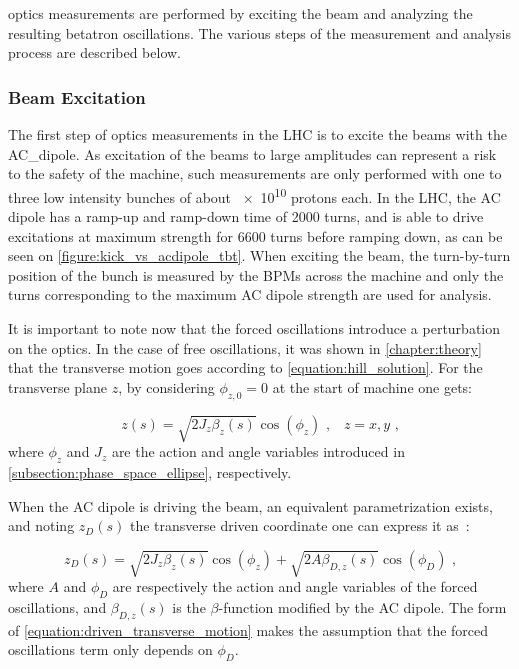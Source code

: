 \Gls{optics} measurements are performed by exciting the beam and analyzing the resulting betatron oscillations.
The various steps of the measurement and analysis process are described below.

\subsubsection*{Beam Excitation}

The first step of optics measurements in the LHC is to excite the beams with the \gls{AC_dipole}.
As excitation of the beams to large amplitudes can represent a risk to the safety of the machine, such measurements are only performed with one to three low intensity bunches of about \num{e10} protons each.
In the LHC, the AC dipole has a ramp-up and ramp-down time of \num{2000} turns, and is able to drive excitations at maximum strength for \num{6600} turns before ramping down, as can be seen on \cref{figure:kick_vs_acdipole_tbt}.
When exciting the beam, the turn-by-turn position of the bunch is measured by the \glspl{BPM} across the machine and only the turns corresponding to the maximum AC dipole strength are used for analysis.

It is important to note now that the forced oscillations introduce a perturbation on the optics.
In the case of free oscillations, it was shown in \cref{chapter:theory} that the transverse motion goes according to \cref{equation:hill_solution}.
For the transverse plane \(z\), by considering \(\phi_{z,0} = 0\) at the start of machine one gets:

\begin{equation}
  z(s) = \sqrt{2 J_z \beta_z(s)} \cos \left( \phi_z \right)  \text{ ,} \quad z = x, y \text{ ,}
  \label{equation:free_transverse_motion}
\end{equation}
where \(\phi_z\) and \(J_z\) are the action and angle variables introduced in \cref{subsection:phase_space_ellipse}, respectively.

When the AC dipole is driving the beam, an equivalent parametrization exists, and noting \(z_D(s)\) the transverse driven coordinate one can express it as~\cite{PHD:Miyamoto,PRAB:Tomas:Normal_Form_Particle_Motion_AC_Dipole}:

\begin{equation}
  z_D(s)=\sqrt{2 J_z \beta_z(s)} \cos \left( \phi_z \right) + \sqrt{2 A \beta_{D,z}(s)} \cos \left( \phi_D \right) \text{ ,}
  \label{equation:driven_transverse_motion}
\end{equation}
where \(A\) and \(\phi_D\) are respectively the action and angle variables of the forced oscillations, and \(\beta_{D,z}(s)\) is the \(\beta\)-function modified by the AC dipole.
The form of \cref{equation:driven_transverse_motion} makes the assumption that the forced oscillations term only depends on \(\phi_D\).

